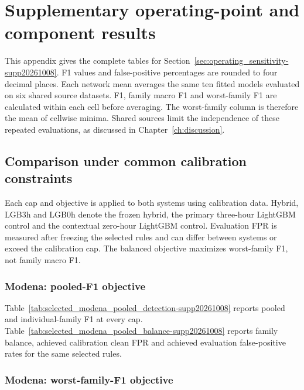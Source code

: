 

\chapter{Supplementary operating-point and component results}

\label{app:operating_sensitivity-supp20261008}

This appendix gives the complete tables for Section~\ref{sec:operating_sensitivity-supp20261008}. F1 values and false-positive percentages are rounded to four decimal places. Each network mean averages the same ten fitted models evaluated on six shared source datasets. F1, family macro F1 and worst-family F1 are calculated within each cell before averaging. The worst-family column is therefore the mean of cellwise minima. Shared sources limit the independence of these repeated evaluations, as discussed in Chapter~\ref{ch:discussion}.

\section{Comparison under common calibration constraints}

Each cap and objective is applied to both systems using calibration data. Hybrid, LGB3h and LGB0h denote the frozen hybrid, the primary three-hour LightGBM control and the contextual zero-hour LightGBM control. Evaluation FPR is measured after freezing the selected rules and can differ between systems or exceed the calibration cap. The balanced objective maximizes worst-family F1, not family macro F1.

\subsection{Modena: pooled-F1 objective}

Table~\ref{tab:selected_modena_pooled_detection-supp20261008} reports pooled and individual-family F1 at every cap. Table~\ref{tab:selected_modena_pooled_balance-supp20261008} reports family balance, achieved calibration clean FPR and achieved evaluation false-positive rates for the same selected rules.





\subsection{Modena: worst-family-F1 objective}


